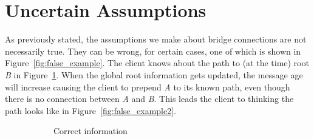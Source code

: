 \section{Uncertain Assumptions}
\label{uncertain_assumptions}
As previously stated, the assumptions we make about bridge connections are not necessarily true.
They can be wrong, for certain cases, one of which is shown in Figure~\ref{fig:false_example}.
The client knows about the path to (at the time) root \textit{B} in Figure~\ref{fig:false_example1}.
When the global root information gets updated, the message age will increase causing the client to prepend \textit{A} to its known path, even though there is no connection between \textit{A} and \textit{B}.
This leads the client to thinking the path looks like in Figure~\ref{fig:false_example2}.

\begin{figure}[h]
    \begin{subfigure}[b]{0.4\textwidth}
        \caption{Correct information}
        \label{fig:false_example1}
    \end{subfigure}
    \hspace{1cm}
    \begin{subfigure}[b]{0.4\textwidth}
\end{subfigure}
\end{figure}
